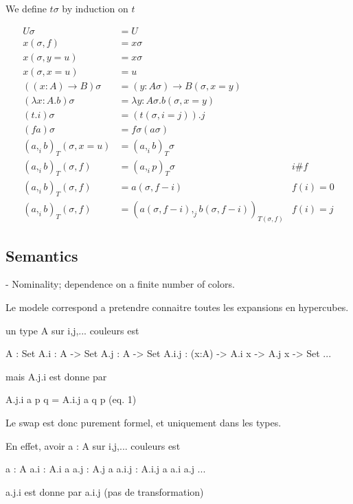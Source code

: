 \documentclass[10pt,a4paper]{article}
\begin{document}
\begin{definition}
We define $tσ$ by induction on $t$

\begin{align*}
  Uσ &= U \\
  x(σ,f) &= xσ \\
  x(σ,y=u) &= xσ \\
  x(σ,x=u) &= u \\
  ((x:A)→ B)σ &= (y:Aσ) → B(σ,x=y) \\
  (λ x:A. b)σ &= λ y:Aσ. b(σ,x=y) \\
  (t.i)σ &= (t(σ,i=j)).j \\
  (f a)σ &= fσ  (aσ) \\
  (a,_i b)_T(σ,x=u)  &= (a,_i b)_Tσ  \\
  (a,_i b)_T(σ,f)  &= (a,_i p)_Tσ & i \# f \\
  (a,_i b)_T(σ,f)  &= a(σ,f-i) & f(i) = 0 \\
  (a,_i b)_T(σ,f)  &= (a(σ,f-i),_j b(σ,f-i))_{T(σ,f)} & f(i) = j
\end{align*}
\end{definition}



\subsection{Semantics}

- Nominality; dependence on a finite number of colors.

Le modele correspond a pretendre connaitre toutes les expansions en hypercubes.

un type A sur i,j,... couleurs est

A : Set
A.i : A -> Set
A.j : A -> Set
A.i.j : (x:A) -> A.i x -> A.j x -> Set
...

mais A.j.i est donne par

A.j.i a p q = A.i.j a q p     (eq. 1)

Le swap est donc purement formel, et uniquement dans les types.

En effet, avoir a : A sur i,j,... couleurs est

a : A
a.i : A.i a
a.j : A.j a
a.i.j : A.i.j a a.i a.j
...

a.j.i est donne par a.i.j (pas de transformation)
\end{document}
